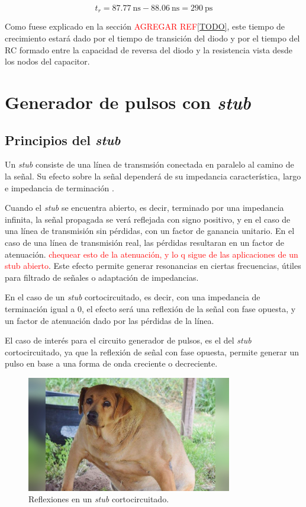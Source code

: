 \begin{equation}
    t_r = \qty{87.77}{\nano\second} - \qty{88.06}{\nano\second} =
    \qty{290}{\pico\second}
\end{equation}

Como fuese explicado en la sección \textcolor{red}{AGREGAR REF\ref{TODO}}, este
tiempo de crecimiento estará dado por el tiempo de transición del diodo y por el
tiempo del RC formado entre la capacidad de reversa del diodo y la resistencia
vista desde los nodos del capacitor.

\section{Generador de pulsos con \textit{stub}}

\subsection{Principios del \textit{stub}}

Un \textit{stub} consiste de una línea de transmsión conectada en paralelo al
camino de la señal. Su efecto sobre la señal dependerá de su impedancia
característica, largo e impedancia de terminación \cite{pozar2011}.

Cuando el \textit{stub} se encuentra abierto, es decir, terminado por una
impedancia infinita, la señal propagada se verá reflejada con signo positivo, y
en el caso de una línea de transmisión sin pérdidas, con un factor de ganancia
unitario. En el caso de una línea de transmisión real, las pérdidas resultaran
en un factor de atenuación. \textcolor{red}{chequear esto de la atenuación, y lo
q sigue de las aplicaciones de un stub abierto}.  Este efecto permite generar
resonancias en ciertas frecuencias, útiles para filtrado de señales o adaptación
de impedancias.

En el caso de un \textit{stub} cortocircuitado, es decir, con una impedancia de
terminación igual a $0$, el efecto será una reflexión de la señal con fase
opuesta, y un factor de atenuación dado por las pérdidas de la línea.

El caso de interés para el circuito generador de pulsos, es el del \textit{stub}
cortocircuitado, ya que la reflexión de señal con fase opuesta, permite generar
un pulso en base a una forma de onda creciente o decreciente.

\begin{figure}[tbp]
    \centering
    \includegraphics[width=0.8\textwidth]{images/placeholder.jpg}
    \caption{Reflexiones en un \textit{stub} cortocircuitado.}
    \label{fig:images-placeholder-jpg}
\end{figure}

